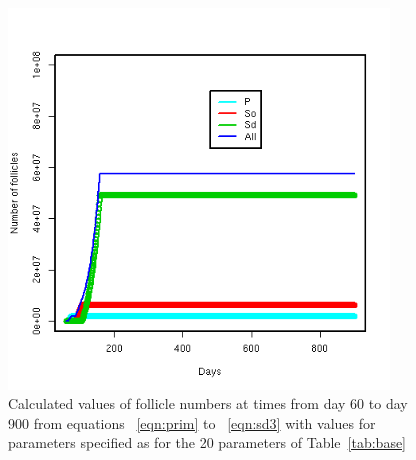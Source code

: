 %

\begin{figure}[!h]
  \centering
   \includegraphics[width=0.9\textwidth]{basefollno.png}
  \caption{Calculated values of follicle numbers at times from day 60 to day 900 from equations ~\ref{eqn:prim} to ~\ref{eqn:sd3} with values for parameters specified as for the 20 parameters of Table~\ref{tab:base}}
  \label{fig:basefollno}
\end{figure}

%

